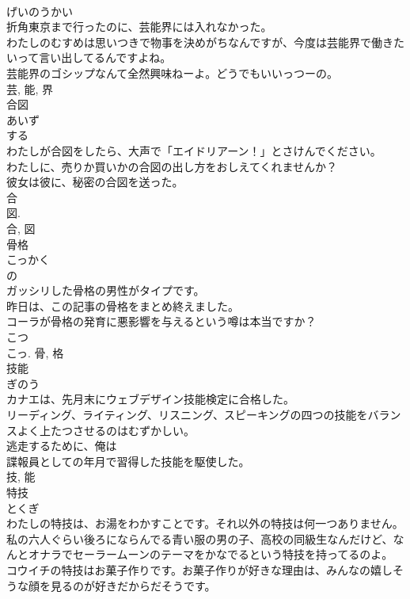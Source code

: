 \documentclass[8pt]{extreport}
\begin{document}
\begin{CJK}{UTF8}{min}
\\	げいのうかい	
\\	折角東京まで行ったのに、芸能界には入れなかった。	
\\	わたしのむすめは思いつきで物事を決めがちなんですが、今度は芸能界で働きたいって言い出してるんですよね。	
\\	芸能界のゴシップなんて全然興味ねーよ。どうでもいいっつーの。	
\\	芸, 能, 界	
\\	合図	
\\	あいず	
\\	する 
\\	わたしが合図をしたら、大声で「エイドリアーン！」とさけんでください。	
\\	わたしに、売りか買いかの合図の出し方をおしえてくれませんか？	
\\	彼女は彼に、秘密の合図を送った。	
\\	合 
\\	図. 
\\	合, 図	
\\	骨格	
\\	こっかく	
\\	の 
\\	ガッシリした骨格の男性がタイプです。	
\\	昨日は、この記事の骨格をまとめ終えました。	
\\	コーラが骨格の発育に悪影響を与えるという噂は本当ですか？	
\\	こつ 
\\	こっ.	骨, 格	
\\	技能	
\\	ぎのう	
\\	カナエは、先月末にウェブデザイン技能検定に合格した。	
\\	リーディング、ライティング、リスニング、スピーキングの四つの技能をバランスよく上たつさせるのはむずかしい。	
\\	逃走するために、俺は
\\	諜報員としての年月で習得した技能を駆使した。	
\\	技, 能	
\\	特技	
\\	とくぎ	
\\	わたしの特技は、お湯をわかすことです。それ以外の特技は何一つありません。	
\\	私の六人ぐらい後ろにならんでる青い服の男の子、高校の同級生なんだけど、なんとオナラでセーラームーンのテーマをかなでるという特技を持ってるのよ。	
\\	コウイチの特技はお菓子作りです。お菓子作りが好きな理由は、みんなの嬉しそうな顔を見るのが好きだからだそうです。	

\end{CJK}
\end{document}
